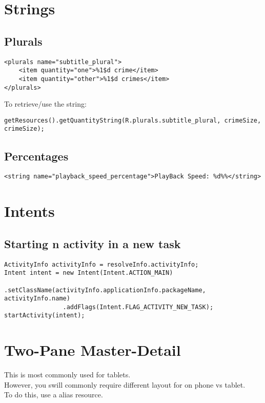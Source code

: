 \documentclass[]{article}
\begin{document}
\section{Strings}
\subsection{Plurals}
\begin{lstlisting}
<plurals name="subtitle_plural">
	<item quantity="one">%1$d crime</item>
	<item quantity="other">%1$d crimes</item>
</plurals>
\end{lstlisting}
To retrieve/use the string:
\begin{lstlisting}
getResources().getQuantityString(R.plurals.subtitle_plural, crimeSize, crimeSize);
\end{lstlisting}

\subsection{Percentages}
\begin{lstlisting}
<string name="playback_speed_percentage">PlayBack Speed: %d%%</string>
\end{lstlisting}

\section{Intents}
\subsection{Starting n activity in a new task}
\begin{lstlisting}
ActivityInfo activityInfo = resolveInfo.activityInfo;
Intent intent = new Intent(Intent.ACTION_MAIN)
				.setClassName(activityInfo.applicationInfo.packageName, activityInfo.name)
				.addFlags(Intent.FLAG_ACTIVITY_NEW_TASK);
startActivity(intent);
\end{lstlisting}

\section{Two-Pane Master-Detail}
This is most commonly used for tablets.  
\\
However, you swill commonly require different layout for on phone vs tablet.
\\
To do this, use a alias resource.
\end{document}
